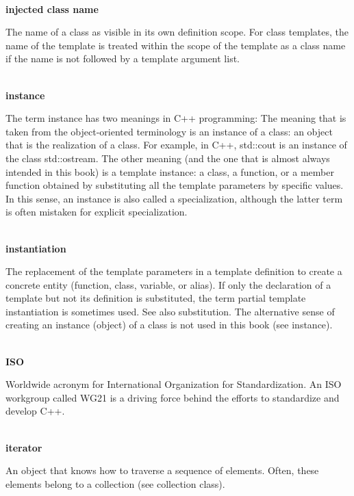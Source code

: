 \hspace*{\fill} \\ %
\noindent
\textbf{injected class name}

The name of a class as visible in its own definition scope. For class templates, the name of the template is treated within the scope of the template as a class name if the name is not followed by a template argument list.

\hspace*{\fill} \\ %
\noindent
\textbf{instance}

The term instance has two meanings in C++ programming: The meaning that is taken from the object-oriented terminology is an instance of a class: an object that is the realization of a class. For example, in C++, std::cout is an instance of the class std::ostream. The other meaning (and the one that is almost always intended in this book) is a template instance: a class, a function, or a member function obtained by substituting all the template parameters by specific values. In this sense, an instance is also called a specialization, although the latter term is often mistaken for explicit specialization.

\hspace*{\fill} \\ %
\noindent
\textbf{instantiation}

The replacement of the template parameters in a template definition to create a concrete entity (function, class, variable, or alias). If only the declaration of a template but not its definition is substituted, the term partial template instantiation is sometimes used. See also substitution. The alternative sense of creating an instance (object) of a class is not used in this book (see instance).

\hspace*{\fill} \\ %
\noindent
\textbf{ISO}

Worldwide acronym for International Organization for Standardization. An ISO workgroup called WG21 is a driving force behind the efforts to standardize and develop C++.

\hspace*{\fill} \\ %
\noindent
\textbf{iterator}

An object that knows how to traverse a sequence of elements. Often, these elements belong to a collection (see collection class).

